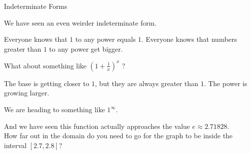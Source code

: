 \documentclass{ximera}
\begin{document}
\begin{example} Indeterminate Forms

We have seen an even weirder indeterminate form.

Everyone knows that $1$ to any power equals $1$. Everyone knows that numbers greater than $1$ to any power get bigger.


What about something like $\left( 1 + \frac{1}{x} \right)^x$ ?

The base is getting closer to $1$, but they are always greater than $1$.  The power is growing larger.  

We are heading to something like $1^{\infty}$.

And we have seen this function actually approaches the value $e \approx 2.71828$. \\

How far out in the domain do you need to go for the graph to be inside the interval $[2.7, 2.8]$?








\begin{center}
\end{center}









\end{example}
\end{document}
